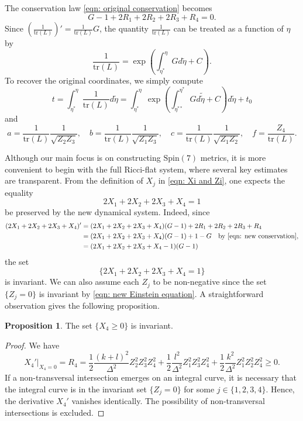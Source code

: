 \documentclass[11pt,letterpaper]{amsart}
\theoremstyle{definition}
\newtheorem{proposition}[theorem]{Proposition}
\numberwithin{equation}{section}
\newcommand{\spin}{\mathrm{Spin}}
\newcommand{\trace}{\mathrm{tr}}
\begin{document}
The conservation law \eqref{eqn: original conservation} becomes
\begin{equation}
\label{eqn: new conservation}
G-1+2R_1+2R_2+2R_3+R_4=0.
\end{equation}
Since $\left(\frac{1}{\trace(L)}\right)'=\frac{1}{\trace(L)}G$, the quantity $\frac{1}{\trace(L)}$ can be treated as a function of $\eta$ by
$$\frac{1}{\trace(L)}=\exp\left(\int_{\eta^*}^{\eta}G d\tilde{\eta}+C\right).$$
To recover the original coordinates, we simply compute
$$
t=\int_{\eta^*}^\eta \frac{1}{\trace(L)} d\tilde{\eta}=\int_{\eta^*}^\eta \exp\left(\int_{\eta^{**}}^{\eta^*}G d\tilde{\tilde{\eta}}+C\right) d\tilde{\eta}+t_0
$$
and 
$$
a=\frac{1}{\trace(L)}\frac{1}{\sqrt{Z_2Z_3}},\quad b=\frac{1}{\trace(L)}\frac{1}{\sqrt{Z_1Z_3}},\quad  c=\frac{1}{\trace(L)}\frac{1}{\sqrt{Z_1Z_2}},\quad f=\frac{Z_4}{\trace(L)}.
$$

Although our main focus is on constructing $\spin(7)$ metrics, it is more convenient to begin with the full Ricci-flat system, where several key estimates are transparent. From the definition of $X_j$ in \eqref{eqn: Xi and Zi}, one expects the equality
\begin{equation}
\label{eqn_trace=1}
2X_1+2X_2+2X_3+X_4=1
\end{equation}
 be preserved by the new dynamical system. Indeed, since 
\begin{equation}
\label{eqn: H=1}
\begin{split}
(2X_1+2X_2+2X_3+X_4)'&=(2X_1+2X_2+2X_3+X_4)(G-1)+2R_1+2R_2+2R_3+R_4\\
&=(2X_1+2X_2+2X_3+X_4)(G-1)+1-G \quad \text{by \eqref{eqn: new conservation}}\\
&=(2X_1+2X_2+2X_3+X_4-1)(G-1)
\end{split},
\end{equation}
the set $$\{2X_1+2X_2+2X_3+X_4=1\}$$ is invariant. We can also assume each $Z_j$ to be non-negative since the set $\{Z_j = 0\}$ is invariant by \eqref{eqn: new Einstein equation}. A straightforward observation gives the following proposition.
\begin{proposition}
\label{prop: X4 not negative}
The set $\{X_4\geq 0\}$ is invariant.
\end{proposition}
\begin{proof}
We have
\begin{equation}
\left.X_4'\right|_{X_4=0}=R_4=\frac{1}{2}\frac{(k+l)^2}{\Delta^2}Z_2^2Z_3^2Z_4^2+\frac{1}{2}\frac{l^2}{\Delta^2}Z_1^2Z_3^2Z_4^2+\frac{1}{2}\frac{k^2}{\Delta^2}Z_1^2Z_2^2Z_4^2\geq 0.
\end{equation}
If a non-transversal intersection emerges on an integral curve, it is necessary that the integral curve is in the invariant set $\{Z_j=0\}$ for some $j\in\{1,2,3,4\}$. Hence, the derivative $X_4'$ vanishes identically. The possibility of non-transversal intersections is excluded.
\end{proof}
\end{document}
